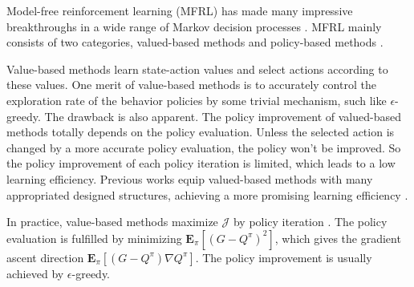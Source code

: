 \documentclass[nohyperref]{article}
\theoremstyle{plain}
\begin{document}


Model-free reinforcement learning (MFRL) has made many impressive breakthroughs in a wide range of Markov decision processes  \citep[MDP]{alpha_star,ftw,agent57}.
MFRL mainly consists of two categories, valued-based methods \citep{dqn,rainbow} and policy-based methods \citep{trpo,ppo,impala}.

Value-based methods learn state-action values and select actions according to these values. 
One merit of value-based methods is to accurately control the exploration rate of the behavior policies by some trivial mechanism, such like $\epsilon$-greedy.
The drawback is also apparent. 
The policy improvement of valued-based methods totally depends on the policy evaluation. 
Unless the selected action is changed by a more accurate policy evaluation, the policy won't be improved. 
So the policy improvement of each policy iteration is limited, which leads to a low learning efficiency.
Previous works equip valued-based methods with many appropriated designed structures, achieving a more promising learning efficiency \citep{dueling_q,priority_q,r2d2}.


In practice, value-based methods maximize $\mathcal{J}$ by policy iteration \citep{sutton}. 
The policy evaluation is fulfilled by minimizing $\textbf{E}_{\pi} [(G - Q^\pi) ^ 2]$, which gives the gradient ascent direction 
$\textbf{E}_{\pi} [(G - Q^\pi) \nabla Q^\pi]$. 
The policy improvement is usually achieved by $\epsilon$-greedy.
\end{document}
